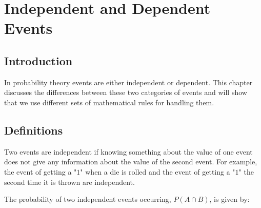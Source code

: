 \chapter{Independent and Dependent Events}
\label{m:p11}



\section{Introduction}
In probability theory events are either independent or dependent. This
chapter discusses the differences between these two categories of
events and will show that we use different sets of mathematical rules
for handling them.


\section{Definitions}
Two events are independent if knowing something about the value of one event does not give any information about the value of the second event. For example, the event of getting a "$1$" when a die is rolled and the event of getting a "$1$" the second time it is thrown are independent.


The probability of two independent events occurring, $P(A \cap B)$, is given by:


